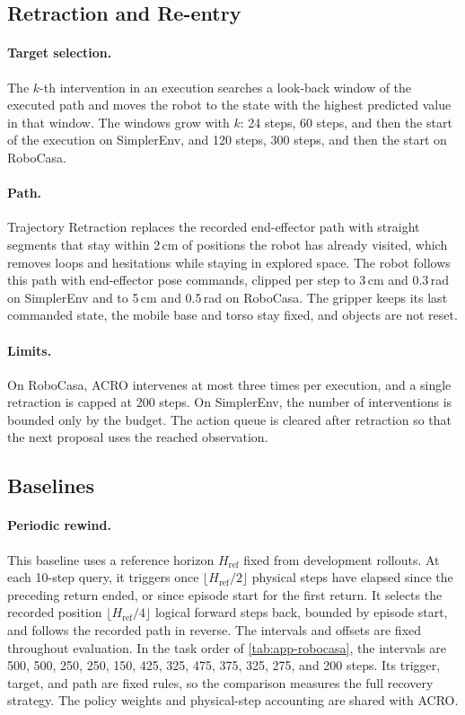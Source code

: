 \subsection{Retraction and Re-entry}
\label{app:retraction}

\paragraph{Target selection.}
The $k$-th intervention in an execution searches a look-back window of the executed path and moves the robot to the state with the highest predicted value in that window. The windows grow with $k$: 24 steps, 60 steps, and then the start of the execution on SimplerEnv, and 120 steps, 300 steps, and then the start on RoboCasa.

\paragraph{Path.}
Trajectory Retraction replaces the recorded end-effector path with straight segments that stay within 2\,cm of positions the robot has already visited, which removes loops and hesitations while staying in explored space. The robot follows this path with end-effector pose commands, clipped per step to 3\,cm and 0.3\,rad on SimplerEnv and to 5\,cm and 0.5\,rad on RoboCasa. The gripper keeps its last commanded state, the mobile base and torso stay fixed, and objects are not reset.

\paragraph{Limits.}
On RoboCasa, ACRO intervenes at most three times per execution, and a single retraction is capped at 200 steps. On SimplerEnv, the number of interventions is bounded only by the budget. The action queue is cleared after retraction so that the next proposal uses the reached observation.

\subsection{Baselines}
\label{app:baselines}

\paragraph{Periodic rewind.}
This baseline uses a reference horizon $H_{\mathrm{ref}}$ fixed from development rollouts. At each 10-step query, it triggers once $\lfloor H_{\mathrm{ref}}/2\rfloor$ physical steps have elapsed since the preceding return ended, or since episode start for the first return. It selects the recorded position $\lfloor H_{\mathrm{ref}}/4\rfloor$ logical forward steps back, bounded by episode start, and follows the recorded path in reverse. The intervals and offsets are fixed throughout evaluation. In the task order of \cref{tab:app-robocasa}, the intervals are 500, 500, 250, 250, 150, 425, 325, 475, 375, 325, 275, and 200 steps. Its trigger, target, and path are fixed rules, so the comparison measures the full recovery strategy. The policy weights and physical-step accounting are shared with ACRO.


